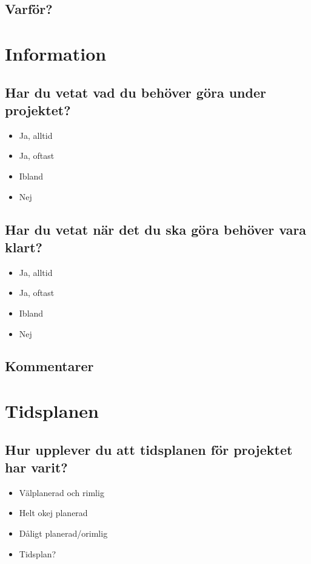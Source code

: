 \documentclass[10pt,a4paper]{article}
\begin{document}
\subsection*{Varför?}

\section*{Information}
\subsection*{Har du vetat vad du behöver göra under projektet?}
\begin{itemize}
\item Ja, alltid
\item Ja, oftast
\item Ibland
\item Nej
\end{itemize}

\subsection*{Har du vetat när det du ska göra behöver vara klart?}
\begin{itemize}
\item Ja, alltid
\item Ja, oftast
\item Ibland
\item Nej
\end{itemize}

\subsection*{Kommentarer}

\section*{Tidsplanen}
\subsection*{Hur upplever du att tidsplanen för projektet har varit?}
\begin{itemize}
\item Välplanerad och rimlig
\item Helt okej planerad
\item Dåligt planerad/orimlig
\item Tidsplan?
\end{itemize}
\end{document}
